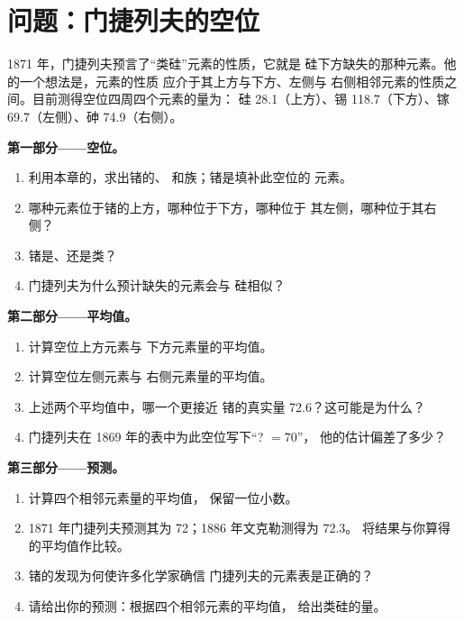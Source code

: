 \section{问题：门捷列夫的空位}

\begin{problem}
\label{pb:g9:periodic-table-first-look:1}
1871 年，门捷列夫预言了“类硅”元素的性质，它就是
硅下方缺失的那种元素。他的一个想法是，元素的性质
应介于其上方与下方、左侧与
右侧相邻元素的性质之间。目前测得空位四周四个元素的量为：
硅 28.1（上方）、锡 118.7（下方）、镓 69.7（左侧）、砷
74.9（右侧）。

\medskip
\noindent\textbf{第一部分——空位。}
\begin{enumerate}
  \item 利用本章的，求出锗的、
        和族；锗是填补此空位的
        元素。
  \item 哪种元素位于锗的上方，哪种位于下方，哪种位于
        其左侧，哪种位于其右侧？
  \item 锗是、还是类？
  \item 门捷列夫为什么预计缺失的元素会与
        硅相似？
\end{enumerate}

\medskip
\noindent\textbf{第二部分——平均值。}
\begin{enumerate}[resume]
  \item 计算空位上方元素与
        下方元素量的平均值。
  \item 计算空位左侧元素与
        右侧元素量的平均值。
  \item 上述两个平均值中，哪一个更接近
        锗的真实量 72.6？这可能是为什么？
  \item 门捷列夫在 1869 年的表中为此空位写下“? $= 70$”，
        他的估计偏差了多少？
\end{enumerate}

\medskip
\noindent\textbf{第三部分——预测。}
\begin{enumerate}[resume]
  \item 计算四个相邻元素量的平均值，
        保留一位小数。
  \item 1871 年门捷列夫预测其为 72；1886 年文克勒测得为 72.3。
        将结果与你算得的平均值作比较。
  \item 锗的发现为何使许多化学家确信
        门捷列夫的元素表是正确的？
  \item 请给出你的预测：根据四个相邻元素的平均值，
        给出类硅的量。
\end{enumerate}
\end{problem}
